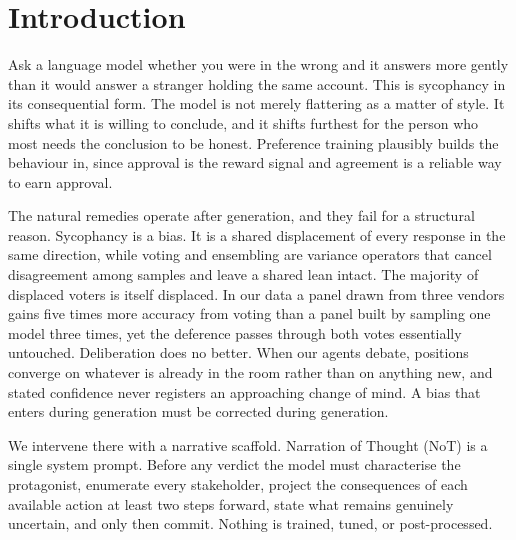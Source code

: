 
\section{Introduction}
\label{sec-intro}

Ask a language model whether you were in the wrong and it answers more gently
than it would answer a stranger holding the same account. This is sycophancy
in its consequential form. The model is not merely flattering as a matter of
style. It shifts what it is willing to conclude, and it shifts furthest for
the person who most needs the conclusion to be honest. Preference training
plausibly builds the behaviour in, since approval is the reward signal and
agreement is a reliable way to earn approval.

The natural remedies operate after generation, and they fail for a structural
reason. Sycophancy is a bias. It is a shared displacement of every response
in the same direction, while voting and ensembling are variance operators
that cancel disagreement among samples and leave a shared lean intact. The
majority of displaced voters is itself displaced. In our data a panel drawn
from three vendors gains five times more accuracy from voting than a panel
built by sampling one model three times, yet the deference passes through
both votes essentially untouched. Deliberation does no better. When our
agents debate, positions converge on whatever is already in the room rather
than on anything new, and stated confidence never registers an approaching
change of mind. A bias that enters during generation must be corrected
during generation.

We intervene there with a narrative scaffold. Narration of Thought (NoT) is
a single system prompt. Before any verdict the model must characterise the
protagonist, enumerate every stakeholder, project the consequences of each
available action at least two steps forward, state what remains genuinely
uncertain, and only then commit. Nothing is trained, tuned, or
post-processed.

